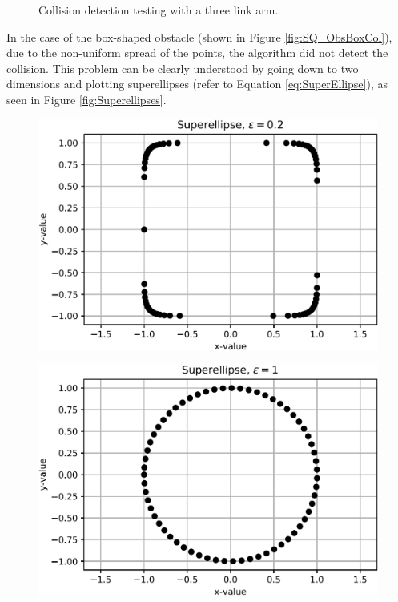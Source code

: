 \begin{figure}[h]
\begin{minipage}[h]{0.3\textwidth}
		\label{fig:ObsSphCol}
	\end{minipage}
	\caption{Collision detection testing with a three link arm.}
	\label{fig:SQ_UniSampling}
\end{figure}

In the case of the box-shaped obstacle (shown in Figure \ref{fig:SQ_ObsBoxCol}), due to the non-uniform spread of the points, the algorithm did not detect the collision. This problem can be clearly understood by going down to two dimensions and plotting superellipses (refer to Equation \ref{eq:SuperEllipse}), as seen in Figure \ref{fig:Superellipses}.

\begin{figure}[h!]
	\centering
	\begin{minipage}[h]{0.7\textwidth}
		\centering
		\includegraphics[width=1\textwidth]{import/Se_Square}
		\label{fig:Se_Square}
	\end{minipage}
	\begin{minipage}[h]{0.3\textwidth}
		\includegraphics[width=1\textwidth]{import/Se_Round}

\end{minipage}
\end{figure}
